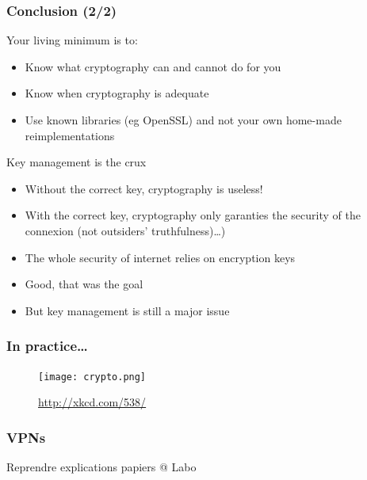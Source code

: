\documentclass[
hyperref={pdfpagelabels=false}
,xcolor=table
]
{beamer}
\begin{document}
\begin{frame}
  \frametitle{Conclusion (2/2)}
\begin{block}{Your living minimum is to: }
	\begin{itemize}
		\item Know what cryptography can and cannot do for you
		\item Know when cryptography is adequate
		\item Use known libraries (eg OpenSSL) and not your own home-made reimplementations
	\end{itemize}	
\end{block}

\begin{block}{Key management is the crux}
	\begin{itemize}
		\item Without the correct key, cryptography is useless!
		\item With the correct key, cryptography only garanties the security of the connexion (not outsiders' truthfulness)\ldots)
	\end{itemize}
\end{block}

\begin{block}{}
  \begin{itemize}
  \item The whole security of internet relies on encryption keys
  \item Good, that was the goal
  \item But key management is still a major issue
  \end{itemize}
\end{block}
\end{frame}



\begin{frame}
  \frametitle{In practice\ldots}
  \begin{figure}
	\centering
	\texttt{[image: crypto.png]}
	
	\url{http://xkcd.com/538/}
  \end{figure}
\end{frame}



\begin{frame}
  \frametitle{VPNs}

  Reprendre explications papiers @ Labo
  
\end{frame}
\end{document}
